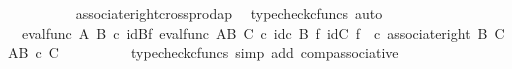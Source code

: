 \begin{isabellebody}
\ \ \ \ \ \ \ \ \isamarkupfalse%
\ associate{\isacharunderscore}{\kern0pt}right{\isacharunderscore}{\kern0pt}crossprod{\isacharunderscore}{\kern0pt}ap\ \isamarkupfalse%
\ {\isacharparenleft}{\kern0pt}typecheck{\isacharunderscore}{\kern0pt}cfuncs{\isacharcomma}{\kern0pt}\ auto{\isacharparenright}{\kern0pt}\isanewline
\ \ \ \ \ \ \isamarkupfalse%
\ \isamarkupfalse%
\ {\isachardoublequoteopen}{\isachardot}{\kern0pt}{\isachardot}{\kern0pt}{\isachardot}{\kern0pt}\ {\isacharequal}{\kern0pt}{\isacharparenleft}{\kern0pt}eval{\isacharunderscore}{\kern0pt}func\ A\ B{\isacharparenright}{\kern0pt}\ {\isasymcirc}\isactrlsub c\ {\isacharparenleft}{\kern0pt}{\isacharparenleft}{\kern0pt}id{\isacharparenleft}{\kern0pt}B{\isacharparenright}{\kern0pt}{\isasymtimes}\isactrlsub f\ eval{\isacharunderscore}{\kern0pt}func\ {\isacharparenleft}{\kern0pt}A\isactrlbsup B\isactrlesup {\isacharparenright}{\kern0pt}\ C{\isacharparenright}{\kern0pt}\ {\isasymcirc}\isactrlsub c\ {\isacharparenleft}{\kern0pt}id\isactrlsub c\ {\isacharparenleft}{\kern0pt}B{\isacharparenright}{\kern0pt}\ {\isasymtimes}\isactrlsub f\ {\isacharparenleft}{\kern0pt}id{\isacharparenleft}{\kern0pt}C{\isacharparenright}{\kern0pt}\ {\isasymtimes}\isactrlsub f\ {\isasymphi}\isactrlsup {\isasymsharp}\isactrlsup {\isasymsharp}{\isacharparenright}{\kern0pt}{\isacharparenright}{\kern0pt}{\isacharparenright}{\kern0pt}\ {\isasymcirc}\isactrlsub c\ {\isacharparenleft}{\kern0pt}associate{\isacharunderscore}{\kern0pt}right\ B\ C\ {\isacharparenleft}{\kern0pt}A\isactrlbsup {\isacharparenleft}{\kern0pt}B\ {\isasymtimes}\isactrlsub c\ C{\isacharparenright}{\kern0pt}\isactrlesup {\isacharparenright}{\kern0pt}{\isacharparenright}{\kern0pt}{\isachardoublequoteclose}\isanewline
\ \ \ \ \ \ \ \ \isamarkupfalse%
\ {\isacharparenleft}{\kern0pt}typecheck{\isacharunderscore}{\kern0pt}cfuncs{\isacharcomma}{\kern0pt}\ simp\ add{\isacharcolon}{\kern0pt}\ comp{\isacharunderscore}{\kern0pt}associative{}{\isacharparenright}{\kern0pt}\isanewline
\ \ \ \ \ \ \isamarkupfalse%
\ \isamarkupfalse%

\end{isabellebody}
